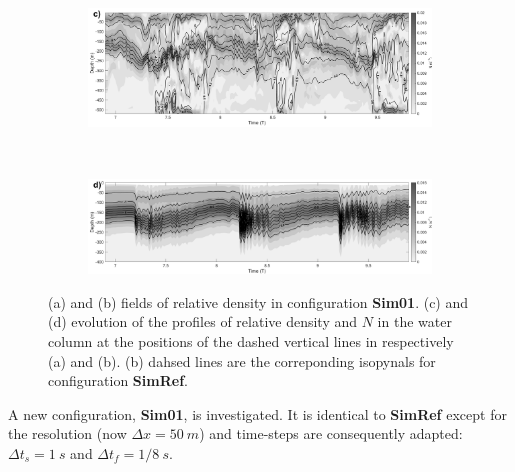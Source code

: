 \documentclass[a4paper,12pt]{article}
\begin{document}
\begin{figure}[!t]
  \begin{subfigure}{1\linewidth}
  \includegraphics[width=\textwidth]{NrhoTZ_50mNH_5785.png}
  \end{subfigure}
    ~
  \begin{subfigure}{1\linewidth}
  \includegraphics[width=\textwidth]{NrhoTZ_50mNH_535.png}
  \end{subfigure}
  \caption{(a) and (b) fields of relative density in configuration \textbf{Sim01}. (c) and (d) evolution of the profiles of relative density and $N$ in the water column at the positions of the dashed vertical lines in respectively (a) and (b). (b) dahsed lines are the correponding isopynals for configuration \textbf{SimRef}.}
  \label{fig50mtvd}
\end{figure}

 
  
 
A new configuration, \textbf{Sim01}, is investigated. It is identical to \textbf{SimRef} except for the resolution (now $\Delta x = 50\ m$) and time-steps are consequently adapted: $\Delta t_s = 1\ s$ and $\Delta t_f = 1/8\ s$. 
\end{document}
